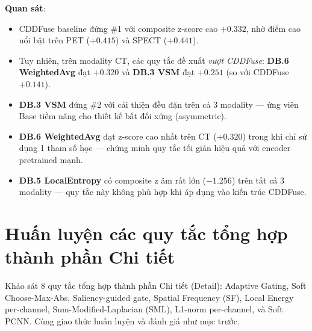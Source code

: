 \documentclass[12pt,a4paper]{article}
\begin{document}
\textbf{Quan sát}:
\begin{itemize}\itemsep0pt
    \item CDDFuse baseline đứng \#1 với composite z-score cao $+0.332$, nhờ điểm cao nổi bật trên PET ($+0.415$) và SPECT ($+0.441$).
    \item Tuy nhiên, trên modality CT, các quy tắc đề xuất \emph{vượt CDDFuse}: \textbf{DB.6 WeightedAvg} đạt $+0.320$ và \textbf{DB.3 VSM} đạt $+0.251$ (so với CDDFuse $+0.141$).
    \item \textbf{DB.3 VSM} đứng \#2 với cải thiện đều đặn trên cả 3 modality --- ứng viên Base tiềm năng cho thiết kế bất đối xứng (asymmetric).
    \item \textbf{DB.6 WeightedAvg} đạt z-score cao nhất trên CT ($+0.320$) trong khi chỉ sử dụng 1 tham số học --- chứng minh quy tắc tối giản hiệu quả với encoder pretrained mạnh.
    \item \textbf{DB.5 LocalEntropy} có composite z âm rất lớn ($-1.256$) trên tất cả 3 modality --- quy tắc này không phù hợp khi áp dụng vào kiến trúc CDDFuse.
\end{itemize}

\section{Huấn luyện các quy tắc tổng hợp thành phần Chi tiết}

Khảo sát 8 quy tắc tổng hợp thành phần Chi tiết (Detail): Adaptive Gating, Soft Choose-Max-Abs, Saliency-guided gate, Spatial Frequency (SF), Local Energy per-channel, Sum-Modified-Laplacian (SML), L1-norm per-channel, và Soft PCNN. Cùng giao thức huấn luyện và đánh giá như mục trước.
\end{document}
